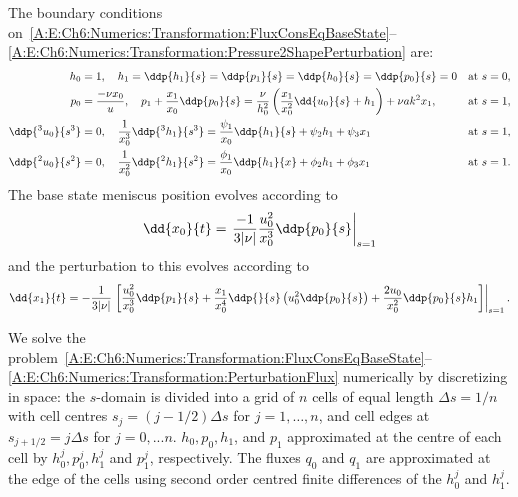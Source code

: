 \begin{subappendices}
The boundary conditions on~\eqref{A:E:Ch6:Numerics:Transformation:FluxConsEqBaseState}--\eqref{A:E:Ch6:Numerics:Transformation:Pressure2ShapePerturbation} are:
\begin{align}
h_0 &= 1, \quad h_1 = \ddp{h_1}{s} = \ddp{p_1}{s} =\ddp{h_0}{s} = \ddp{p_0}{s} = 0 & &\text{at}~s = 0,\label{A:E:Ch6:Numerics:Transformation:clampedBC}\\
p_0 &= \frac{-\nu x_0}{u},\quad
p_1 + \frac{x_1}{x_0} \ddp{p_0}{s} =\frac{\nu}{\h_0^2}\left(\frac{x_1}{x_0^2}\dd{u_0}{s} + h_1\right) + \nu \aspect  k^2 x_1, & &\text{at}~s = 1,
\label{A:E:Ch6:Numerics:Transformation:pressureBC}\\
\ddp{^3 u_0}{s^3} &= 0, \quad \frac{1}{x_0^3}\ddp{^3 h_1}{s^3} = \frac{\psi_1}{x_0} \ddp{h_1}{s} + \psi_2 h_1 + \psi_3 x_1 & &\text{at}~s = 1,\label{A:E:Ch6:Numerics:Transformation:effectiveBC1}\\
\ddp{^2 u_0}{s^2} &= 0, \quad \frac{1}{x_0^2}\ddp{^2 h_1}{s^2} =  \frac{\phi_1}{x_0} \ddp{h_1}{x} + \phi_2 h_1 + \phi_3 x_1 & &\text{at}~s = 1.\label{A:E:Ch6:Numerics:Transformation:effectiveBC2}
\end{align}
The base state meniscus position evolves according to
\begin{equation}\label{A:E:Ch6:Numerics:Transformation:kinematic_x0}
\dd{x_0}{t} =\left. \frac{-1}{3|\nu|}\frac{u_0^2}{x_0^3}\ddp{p_0}{s}\right|_{s = 1}
\end{equation}
and the perturbation to this evolves according to
\begin{equation}\label{A:E:Ch6:Numerics:Transformation:kinematic_x1}
\dd{x_1}{t} =-\frac{1}{3|\nu|}\left.\left[\frac{ u_0^2}{x_0^3} \ddp{p_1}{s} + \frac{x_1}{x_0^4} \ddp{}{s}\left(u_0^2 \ddp{p_0}{s} \right) + \frac{2 u_0}{x_0^2} \ddp{p_0}{s} h_1 \right]\right|_{s=1}.
\end{equation}

We solve the problem~\eqref{A:E:Ch6:Numerics:Transformation:FluxConsEqBaseState}--\eqref{A:E:Ch6:Numerics:Transformation:PerturbationFlux} numerically by discretizing in space: the $s$-domain is divided into a grid of $n$ cells of equal length $\Delta s = 1/n$ with cell centres $s_j = (j - 1/2)\Delta s$ for $j = 1,\dots,n$, and cell edges at $s_{j+1/2} = j\Delta s$ for $j = 0,...n$. $h_0,p_0,h_1$, and $p_1$ approximated at the centre of each cell by $h_0^j, p_0^j, h_1^j$ and $p_1^j$, respectively. The fluxes $q_0$ and $q_1$ are approximated at the edge of the cells using second order centred finite differences of the $h_0^j$ and $h_1^j$.


\end{subappendices}
